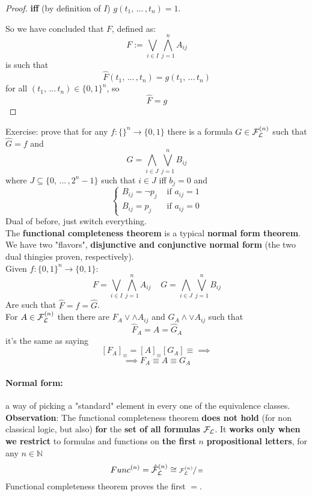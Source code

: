 \documentclass[11pt]{article}
\begin{document}
\begin{proof}
		\textbf{iff } (by definition of $I$) $g(t_1, \, ... \, , t_n) = 1$.\\
		
		\newpage
		
		So we have concluded that $F$, defined as:
		$$ F := \bigvee_{i \in I} \bigwedge_{j=1}^n A_{ij}$$
		is such that 
		$$ \hat F (t_1, \, ... \, , t_n) = g(t_1, \, ... \, t_n) $$
		for all $(t_1, \, ... \, t_n) \in \{0,1\}^n$, so
		$$ \hat F = g $$
	\end{proof}
	
	Exercise: prove that for any $f: \{\}^n \rightarrow \{0,1\}$ there is a formula $G \in \mathcal{F}_\mathcal{L}^{(n)}$ such that $\hat G = f$ and 
	$$G = \bigwedge_{i \in J} \bigvee_{j=1}^n B_{ij} $$
	where $J \subseteq \{0, \, ... \, , 2^n - 1\}$ such that $i \in J$ iff $b_j = 0$ and 
	$$ 
	\begin{cases}
		B_{ij} = \neg p_j & \text{ if } a_{ij} = 1 \\
		B_{ij} = p_j & \text{ if } a_{ij} = 0
	\end{cases}
	$$
	Dual of before, just switch everything.\\
	
	The \textbf{functional completeness theorem} is a typical \textbf{normal form theorem}. We have two "flavors", \textbf{disjunctive and conjunctive normal form} (the two dual thingies proven, respectively).\\
	
	Given $f: \{0,1\}^n \rightarrow \{0,1\}$:
	$$F  =  \bigvee_{i \in I} \bigwedge_{j=1}^n A_{ij} \;\;\;\; G = \bigwedge_{i \in J} \bigvee_{j=1}^n B_{ij} $$
	Are such that $\hat F = f = \hat G$.\\
	
	For  $A \in \mathcal{F}_\mathcal{L}^{(n)}$ then there are $F_A \vee \wedge A_{ij}$ and $G_A \wedge \vee A_{ij}$ such that 
	$$ \hat F_A = \hat A = \hat G_A$$
	it's the same as saying 
	$$ [F_A]_\equiv = [A]_\equiv [G_A]\equiv \implies$$
	$$ \implies F_A \equiv A \equiv G_A $$
	
	
	\paragraph{Normal form:} a way of picking a "standard" element in every one of the equivalence classes.\\ 
	
	\textbf{Observation}: The functional completeness theorem \textbf{does not hold} (for non classical logic, but also) \textbf{for} the \textbf{set of all formulas} $\mathcal{F}_\mathcal{L}$. It \textbf{works only when we restrict} to formulas and functions on \textbf{the first} $n$ \textbf{propositional letters}, for any $n \in \mathbb{N}$
	$$ Func^{(n)} = \hat{\mathcal{F}}_\mathcal{L}^{(n)} \cong \sfrac{\mathcal{F}_\mathcal{L}^{(n)}}{\equiv} $$
	Functional completeness theorem proves the first $=$.\\
	
\end{document}
